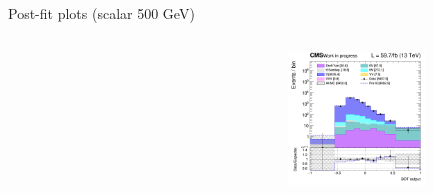 \documentclass[8pt]{beamer}
\begin{document}
\begin{frame}{Post-fit plots (scalar 500 GeV)}
\begin{columns}
\begin{column}{0.33\textwidth}
\begin{center}
    		\end{center}		
		\end{column}
		\begin{column}{0.33\textwidth}
			\begin{center}
     			\includegraphics[width=1.0\textwidth, height=100pt]{figs/postfits/2018/log_cratio_TTbar_topCR_ll_BDT_ttDM500_TTbar_BDT_output_scalar500_customBinsAttempt7.png}
    		\end{center}		
		\end{column}
\end{columns} \vfill
\end{frame}
\end{document}
